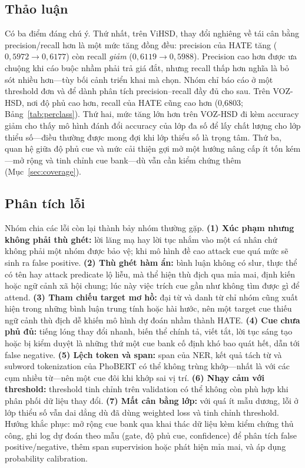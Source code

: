 \documentclass[11pt]{article}
\begin{document}
\subsection{Thảo luận}
Có ba điểm đáng chú ý. Thứ nhất, trên ViHSD, thay đổi nghiêng về tái cân bằng precision/recall hơn là một mức tăng đồng đều: precision của HATE tăng ($0{,}5972\!\to\!0{,}6177$) còn recall \emph{giảm} ($0{,}6119\!\to\!0{,}5988$). Precision cao hơn được ưa chuộng khi cáo buộc nhầm phải trả giá đắt, nhưng recall thấp hơn nghĩa là bỏ sót nhiều hơn---tùy bối cảnh triển khai mà chọn. Nhóm chỉ báo cáo ở một threshold đơn và để dành phân tích precision--recall đầy đủ cho sau. Trên VOZ-HSD, nơi độ phủ cao hơn, recall của HATE cũng cao hơn (0,6803; Bảng~\ref{tab:perclass}). Thứ hai, mức tăng lớn hơn trên VOZ-HSD đi kèm accuracy giảm cho thấy mô hình đánh đổi accuracy của lớp đa số để lấy chất lượng cho lớp thiểu số---điều thường được mong đợi khi lớp thiểu số là trọng tâm. Thứ ba, quan hệ giữa độ phủ cue và mức cải thiện gợi mở một hướng nâng cấp ít tốn kém---mở rộng và tinh chỉnh cue bank---dù vẫn cần kiểm chứng thêm (Mục~\ref{sec:coverage}).

\subsection{Phân tích lỗi}
Nhóm chia các lỗi còn lại thành bảy nhóm thường gặp. \textbf{(1) Xúc phạm nhưng không phải thù ghét:} lời lăng mạ hay lời tục nhắm vào một cá nhân chứ không phải một nhóm được bảo vệ; khi mô hình đề cao attack cue quá mức sẽ sinh ra false positive. \textbf{(2) Thù ghét hàm ẩn:} bình luận không có slur, thực thể có tên hay attack predicate lộ liễu, mà thể hiện thù địch qua mỉa mai, định kiến hoặc ngữ cảnh xã hội chung; lúc này việc trích cue gần như không tìm được gì để attend. \textbf{(3) Tham chiếu target mơ hồ:} đại từ và danh từ chỉ nhóm cũng xuất hiện trong những bình luận trung tính hoặc hài hước, nên một target cue thiếu ngữ cảnh thù địch dễ khiến mô hình dự đoán nhầm thành HATE. \textbf{(4) Cue chưa phủ đủ:} tiếng lóng thay đổi nhanh, biến thể chính tả, viết tắt, lời tục sáng tạo hoặc bị kiểm duyệt là những thứ một cue bank cố định khó bao quát hết, dẫn tới false negative. \textbf{(5) Lệch token và span:} span của NER, kết quả tách từ và subword tokenization của PhoBERT có thể không trùng khớp---nhất là với các cụm nhiều từ---nên một cue đôi khi khớp sai vị trí. \textbf{(6) Nhạy cảm với threshold:} threshold tinh chỉnh trên validation có thể không còn phù hợp khi phân phối dữ liệu thay đổi. \textbf{(7) Mất cân bằng lớp:} với quá ít mẫu dương, lỗi ở lớp thiểu số vẫn dai dẳng dù đã dùng weighted loss và tinh chỉnh threshold. Hướng khắc phục: mở rộng cue bank qua khai thác dữ liệu kèm kiểm chứng thủ công, ghi log dự đoán theo mẫu (gate, độ phủ cue, confidence) để phân tích false positive/negative, thêm span supervision hoặc phát hiện mỉa mai, và áp dụng probability calibration.
\end{document}
